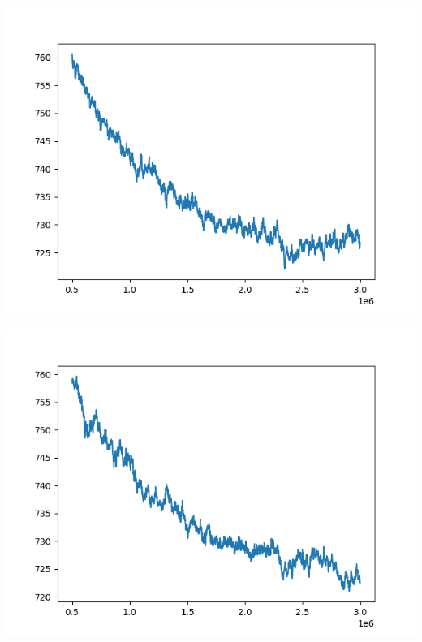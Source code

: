 \documentclass{article}
\begin{document}
\begin{enumerate}[label=\arabic*.]
\begin{minipage}{0.4\linewidth}
            \includegraphics[width=\linewidth]{../starter_code/figs/sgd_k50.png}
        \end{minipage}\hfill
        \begin{minipage}{0.4\linewidth}
            \includegraphics[width=\linewidth]{../starter_code/figs/sgd_k60.png}
        \end{minipage}\hfill
        \begin{minipage}{0.4\linewidth}

\end{minipage}
\end{enumerate}
\end{document}
